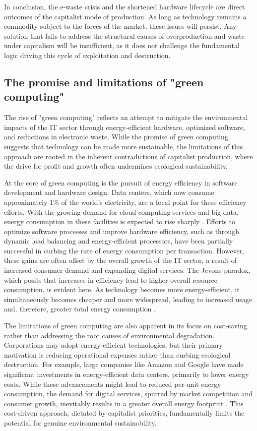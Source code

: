 \begin{refsection}
In conclusion, the e-waste crisis and the shortened hardware lifecycle are direct outcomes of the capitalist mode of production. As long as technology remains a commodity subject to the forces of the market, these issues will persist. Any solution that fails to address the structural causes of overproduction and waste under capitalism will be insufficient, as it does not challenge the fundamental logic driving this cycle of exploitation and destruction.

\subsection{The promise and limitations of "green computing"}

The rise of "green computing" reflects an attempt to mitigate the environmental impacts of the IT sector through energy-efficient hardware, optimized software, and reductions in electronic waste. While the promise of green computing suggests that technology can be made more sustainable, the limitations of this approach are rooted in the inherent contradictions of capitalist production, where the drive for profit and growth often undermines ecological sustainability.

At the core of green computing is the pursuit of energy efficiency in software development and hardware design. Data centers, which now consume approximately 1\% of the world’s electricity, are a focal point for these efficiency efforts. With the growing demand for cloud computing services and big data, energy consumption in these facilities is expected to rise sharply \cite[pp.~90-92]{masanet2020recalibrating}. Efforts to optimize software processes and improve hardware efficiency, such as through dynamic load balancing and energy-efficient processors, have been partially successful in curbing the rate of energy consumption per transaction. However, these gains are often offset by the overall growth of the IT sector, a result of increased consumer demand and expanding digital services. The Jevons paradox, which posits that increases in efficiency lead to higher overall resource consumption, is evident here. As technology becomes more energy-efficient, it simultaneously becomes cheaper and more widespread, leading to increased usage and, therefore, greater total energy consumption \cite[pp.~15-17]{polimeni2008jevons}.

The limitations of green computing are also apparent in its focus on cost-saving rather than addressing the root causes of environmental degradation. Corporations may adopt energy-efficient technologies, but their primary motivation is reducing operational expenses rather than curbing ecological destruction. For example, large companies like Amazon and Google have made significant investments in energy-efficient data centers, primarily to lower energy costs. While these advancements might lead to reduced per-unit energy consumption, the demand for digital services, spurred by market competition and consumer growth, inevitably results in a greater overall energy footprint \cite[pp.~210-212]{koomey2011growth}. This cost-driven approach, dictated by capitalist priorities, fundamentally limits the potential for genuine environmental sustainability.


\end{refsection}

